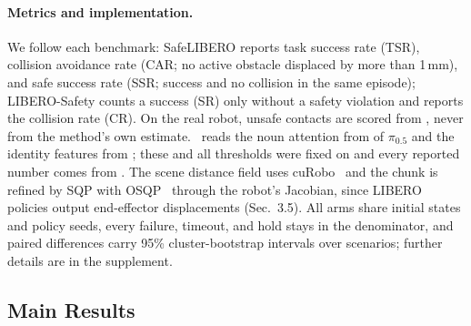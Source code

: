 \paragraph{Metrics and implementation.}
We follow each benchmark: SafeLIBERO reports task success rate (TSR), collision avoidance rate (CAR; no active obstacle displaced by more than 1\,mm), and safe success rate (SSR; success and no collision in the same episode); LIBERO-Safety counts a success (SR) only without a safety violation and reports the collision rate (CR). On the real robot, unsafe contacts are scored from , never from the method's own estimate. \sys\ reads the noun attention from  of $\pi_{0.5}$ and the identity features from ; these and all thresholds were fixed on  and every reported number comes from . The scene distance field uses cuRobo~\cite{sundaralingam2023curobo} and the chunk is refined by SQP with OSQP~\cite{stellato2020osqp} through the robot's Jacobian, since LIBERO policies output end-effector displacements (Sec.~3.5). All arms share initial states and policy seeds, every failure, timeout, and hold stays in the denominator, and paired differences carry 95\% cluster-bootstrap intervals over scenarios; further details are in the supplement.

\subsection{Main Results}
\label{sec:exp:main}

